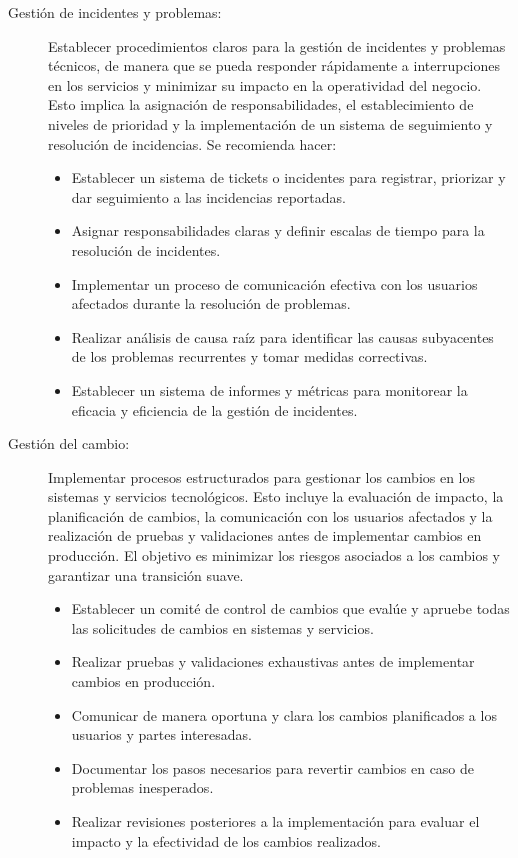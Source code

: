 \documentclass{article}
\begin{document}
\begin{description}
    \item[Gestión de incidentes y problemas:] Establecer procedimientos claros para la gestión de incidentes y problemas técnicos, de manera que se pueda responder rápidamente a interrupciones en los servicios y minimizar su impacto en la operatividad del negocio. Esto implica la asignación de responsabilidades, el establecimiento de niveles de prioridad y la implementación de un sistema de seguimiento y resolución de incidencias. Se recomienda hacer:
    \begin{itemize}[label=$\circ$]
        \item Establecer un sistema de tickets o incidentes para registrar, priorizar y dar seguimiento a las incidencias reportadas.
        \item Asignar responsabilidades claras y definir escalas de tiempo para la resolución de incidentes.
        \item Implementar un proceso de comunicación efectiva con los usuarios afectados durante la resolución de problemas.
        \item Realizar análisis de causa raíz para identificar las causas subyacentes de los problemas recurrentes y tomar medidas correctivas.
        \item Establecer un sistema de informes y métricas para monitorear la eficacia y eficiencia de la gestión de incidentes.
    \end{itemize}
    
    \item[Gestión del cambio:] Implementar procesos estructurados para gestionar los cambios en los sistemas y servicios tecnológicos. Esto incluye la evaluación de impacto, la planificación de cambios, la comunicación con los usuarios afectados y la realización de pruebas y validaciones antes de implementar cambios en producción. El objetivo es minimizar los riesgos asociados a los cambios y garantizar una transición suave.
    \begin{itemize}[label=$\circ$]
        \item Establecer un comité de control de cambios que evalúe y apruebe todas las solicitudes de cambios en sistemas y servicios.
        \item Realizar pruebas y validaciones exhaustivas antes de implementar cambios en producción.
        \item Comunicar de manera oportuna y clara los cambios planificados a los usuarios y partes interesadas.
        \item Documentar los pasos necesarios para revertir cambios en caso de problemas inesperados.
        \item Realizar revisiones posteriores a la implementación para evaluar el impacto y la efectividad de los cambios realizados.
    \end{itemize}
    

\end{description}
\end{document}
